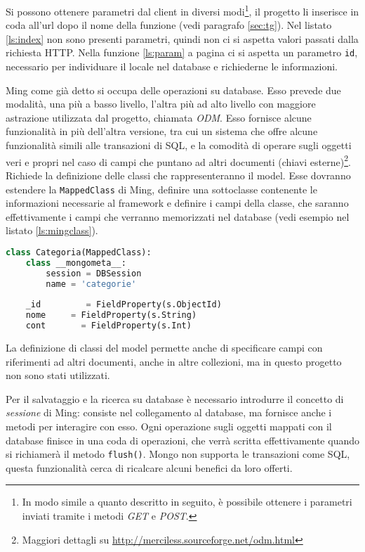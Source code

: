 Si possono ottenere parametri dal client in diversi modi\footnote{In modo simile a quanto descritto in seguito, è possibile ottenere i parametri inviati tramite i metodi \emph{GET} e \emph{POST}.}, il progetto li inserisce in coda all'url dopo il nome della funzione (vedi paragrafo \ref{sec:tg}). Nel listato \ref{ls:index} non sono presenti parametri, quindi non ci si aspetta valori passati dalla richiesta HTTP. Nella funzione \ref{ls:param} a pagina \pageref{ls:param} ci si aspetta un parametro \texttt{id}, necessario per individuare il locale nel database e richiederne le informazioni.

Ming come già detto si occupa delle operazioni su database. Esso prevede due modalità, una più a basso livello, l'altra più ad alto livello con maggiore astrazione utilizzata dal progetto, chiamata \emph{ODM}. Esso fornisce alcune funzionalità in più dell'altra versione, tra cui un sistema che offre alcune funzionalità simili alle transazioni di SQL, e la comodità di operare sugli oggetti veri e propri nel caso di campi che puntano ad altri documenti (chiavi esterne)\footnote{Maggiori dettagli su \url{http://merciless.sourceforge.net/odm.html}}. Richiede la definizione delle classi che rappresenteranno il model. Esse dovranno estendere la \texttt{MappedClass} di Ming, definire una sottoclasse contenente le informazioni necessarie al framework e definire i campi della classe, che saranno effettivamente i campi che verranno memorizzati nel database (vedi esempio nel listato \ref{ls:mingclass}).

\begin{lstlisting}[label=ls:mingclass,caption={Classe della collezione di categorie, con i campi da salvare sul database.},language=Python]
class Categoria(MappedClass):
    class __mongometa__:
        session = DBSession
        name = 'categorie'
        
    _id         = FieldProperty(s.ObjectId)
    nome     = FieldProperty(s.String)
    cont       = FieldProperty(s.Int)
\end{lstlisting}

La definizione di classi del model permette anche di specificare campi con riferimenti ad altri documenti, anche in altre collezioni, ma in questo progetto non sono stati utilizzati.

Per il salvataggio e la ricerca su database è necessario introdurre il concetto di \emph{sessione} di Ming: consiste nel collegamento al database, ma fornisce anche i metodi per interagire con esso. Ogni operazione sugli oggetti mappati con il database finisce in una coda di operazioni, che verrà scritta effettivamente quando si richiamerà il metodo \texttt{flush()}. Mongo non supporta le transazioni come SQL, questa funzionalità cerca di ricalcare alcuni benefici da loro offerti.

